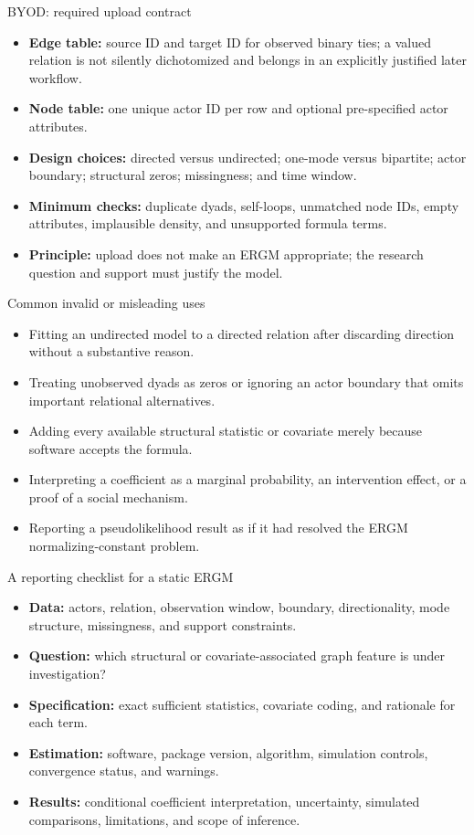 \documentclass[aspectratio=169,11pt]{beamer}
\newcommand{\term}[1]{\textbf{\color{nupurple}#1}}
\begin{document}
\begin{frame}{BYOD: required upload contract}
\begin{itemize}
\item \term{Edge table:} source ID and target ID for observed binary ties; a valued relation is not silently dichotomized and belongs in an explicitly justified later workflow.
\item \term{Node table:} one unique actor ID per row and optional pre-specified actor attributes.
\item \term{Design choices:} directed versus undirected; one-mode versus bipartite; actor boundary; structural zeros; missingness; and time window.
\item \term{Minimum checks:} duplicate dyads, self-loops, unmatched node IDs, empty attributes, implausible density, and unsupported formula terms.
\item \term{Principle:} upload does not make an ERGM appropriate; the research question and support must justify the model.
\end{itemize}
\end{frame}

\begin{frame}{Common invalid or misleading uses}
\begin{itemize}
\item Fitting an undirected model to a directed relation after discarding direction without a substantive reason.
\item Treating unobserved dyads as zeros or ignoring an actor boundary that omits important relational alternatives.
\item Adding every available structural statistic or covariate merely because software accepts the formula.
\item Interpreting a coefficient as a marginal probability, an intervention effect, or a proof of a social mechanism.
\item Reporting a pseudolikelihood result as if it had resolved the ERGM normalizing-constant problem.
\end{itemize}
\end{frame}

\begin{frame}{A reporting checklist for a static ERGM}
\begin{itemize}
\item \term{Data:} actors, relation, observation window, boundary, directionality, mode structure, missingness, and support constraints.
\item \term{Question:} which structural or covariate-associated graph feature is under investigation?
\item \term{Specification:} exact sufficient statistics, covariate coding, and rationale for each term.
\item \term{Estimation:} software, package version, algorithm, simulation controls, convergence status, and warnings.
\item \term{Results:} conditional coefficient interpretation, uncertainty, simulated comparisons, limitations, and scope of inference.
\end{itemize}
\end{frame}
\end{document}
